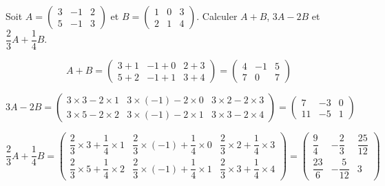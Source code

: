 \documentclass[11pt,fleqn]{book} %
\begin{document}
\begin{exercise}[topic=mat02] Soit $A = \begin{pmatrix} 3 & -1 & 2 \\ 5 & -1 & 3\end{pmatrix}$ et $B=\begin{pmatrix}1 & 0 & 3 \\ 2 & 1& 4\end{pmatrix}$. Calculer $A+B$, $3A-2B$ et $\dfrac{2}{3}A + \dfrac{1}{4}B$.\end{exercise}

\begin{solution}\[A+B = \begin{pmatrix} 3+1 & -1+0 & 2+3 \\ 5+2 & -1+1 & 3+4 \end{pmatrix} = \begin{pmatrix} 4 & -1 & 5 \\ 7 & 0 & 7\end{pmatrix}\]

\[3A-2B = \begin{pmatrix} 3\times 3-2\times 1 & 3\times(-1)-2\times0 & 3\times2-2\times3 \\ 3\times5-2\times 2 & 3\times(-1)-2\times1 & 3\times 3-2\times 4 \end{pmatrix} =\begin{pmatrix} 7 & -3 & 0 \\ 11 & -5 & 1\end{pmatrix}\]

\[ \dfrac{2}{3}A + \dfrac{1}{4}B = \begin{pmatrix} \dfrac{2}{3}\times 3+ \dfrac{1}{4}\times 1 & \dfrac{2}{3}\times(-1)+ \dfrac{1}{4}\times0 & \dfrac{2}{3}\times2+ \dfrac{1}{4}\times3 \\ \dfrac{2}{3}\times5+ \dfrac{1}{4}\times 2 & \dfrac{2}{3}\times(-1)+ \dfrac{1}{4}\times1 & \dfrac{2}{3}\times 3+ \dfrac{1}{4}\times 4 \end{pmatrix} = \begin{pmatrix} \dfrac{9}{4} & - \dfrac{2}{3} & \dfrac{25}{12} \\ \dfrac{23}{6} & -\dfrac{5}{12} & 3\end{pmatrix} \]\end{solution}
\end{document}
